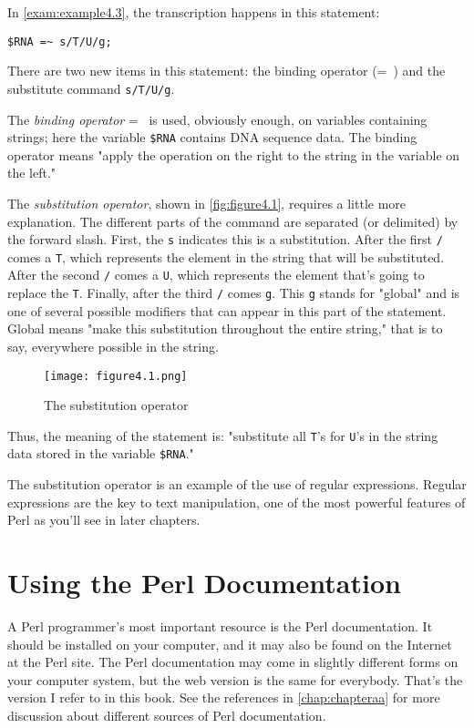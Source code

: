 In \autoref{exam:example4.3}, the transcription happens in this statement:

\begin{lstlisting}
$RNA =~ s/T/U/g;
\end{lstlisting}

There are two new items in this statement: the binding operator (=~) and the substitute command \verb|s/T/U/g|.

The \textit{binding operator} =~ is used, obviously enough, on variables containing strings; here the variable \verb|$RNA| contains DNA sequence data. The binding operator means "apply the operation on the right to the string in the variable on the left."

The \textit{substitution operator}, shown in \autoref{fig:figure4.1}, requires a little more explanation. The different parts of the command are separated (or delimited) by the forward slash. First, the \verb|s| indicates this is a substitution. After the first \verb|/| comes a \verb|T|, which represents the element in the string that will be substituted. After the second \verb|/| comes a \verb|U|, which represents the element that's going to replace the \verb|T|. Finally, after the third \verb|/| comes \verb|g|. This \verb|g| stands for "global" and is one of several possible modifiers that can appear in this part of the statement. Global means "make this substitution throughout the entire string," that is to say, everywhere possible in the string. 

\begin{figure}
  \centering
  \texttt{[image: figure4.1.png]}
  \caption{The substitution operator}
  \label{fig:figure4.1}
\end{figure}

Thus, the meaning of the statement is: "substitute all \verb|T|'s for \verb|U|'s in the string data stored in the variable \verb|$RNA|."

The substitution operator is an example of the use of regular expressions. Regular expressions are the key to text manipulation, one of the most powerful features of Perl as you'll see in later chapters. 

\section{Using the Perl Documentation}
A Perl programmer's most important resource is the Perl documentation. It should be installed on your computer, and it may also be found on the Internet at the Perl site. The Perl documentation may come in slightly different forms on your computer system, but the web version is the same for everybody. That's the version I refer to in this book. See the references in \autoref{chap:chapteraa} for more discussion about different sources of Perl documentation.

